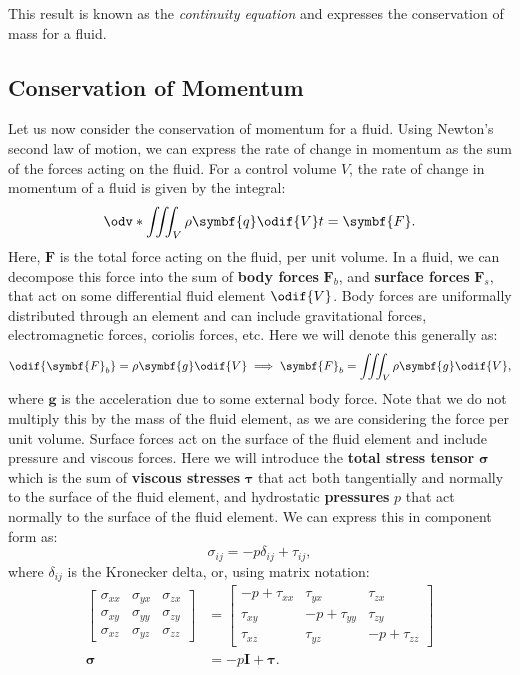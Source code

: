 \documentclass{article}
\theoremstyle{definition}
\begin{document}
This result is known as the \textit{continuity equation} and expresses
the conservation of mass for a fluid.
\subsection{Conservation of Momentum}
Let us now consider the conservation of momentum for a fluid. Using
Newton's second law of motion, we can express the rate of change in
momentum as the sum of the forces acting on the fluid. For a control
volume \(V\), the rate of change in momentum of a fluid is given by
the integral:
\begin{equation*}
    \odv*{\iiint_V \rho \symbf{q} \odif{V}}{t} = \symbf{F}.
\end{equation*}
Here, \(\symbf{F}\) is the total force acting on the fluid, per unit
volume. In a fluid, we can decompose this force into the sum of
\textbf{body forces} \(\symbf{F}_b\), and \textbf{surface forces}
\(\symbf{F}_s\), that act on some differential fluid element \(\odif{V}\).
Body forces are uniformally distributed through an element and can
include gravitational forces, electromagnetic forces, coriolis forces,
etc. Here we will denote this generally as:
\begin{equation*}
    \odif{\symbf{F}_b} = \rho \symbf{g} \odif{V} \implies \symbf{F}_b = \iiint_V \rho \symbf{g} \odif{V},
\end{equation*}
where \(\symbf{g}\) is the acceleration due to some external body force.
Note that we do not multiply this by the mass of the fluid element, as
we are considering the force per unit volume. Surface forces act on the
surface of the fluid element and include pressure and viscous forces.
Here we will introduce the \textbf{total stress tensor} \(\symbf{\sigma}\)
which is the sum of \textbf{viscous stresses} \(\symbf{\tau}\) that
act both tangentially and normally to the surface of the fluid element,
and hydrostatic \textbf{pressures} \(p\) that act normally to the
surface of the fluid element. We can express this in component form as:
\begin{equation*}
    \sigma_{ij} = -p \delta_{ij} + \tau_{ij},
\end{equation*}
where \(\delta_{ij}\) is the Kronecker delta, or, using matrix notation:
\begin{align*}
    \begin{bmatrix}
        \sigma_{xx} & \sigma_{yx} & \sigma_{zx} \\
        \sigma_{xy} & \sigma_{yy} & \sigma_{zy} \\
        \sigma_{xz} & \sigma_{yz} & \sigma_{zz}
    \end{bmatrix}
                   & =
    \begin{bmatrix}
        -p + \tau_{xx} & \tau_{yx}      & \tau_{zx}      \\
        \tau_{xy}      & -p + \tau_{yy} & \tau_{zy}      \\
        \tau_{xz}      & \tau_{yz}      & -p + \tau_{zz}
    \end{bmatrix}
    \\
    \symbf{\sigma} & = -p \symbf{I} + \symbf{\tau}.
\end{align*}
\end{document}
